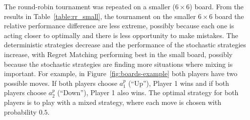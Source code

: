 \documentclass{article}
\begin{document}
%
The round-robin tournament was repeated on a smaller ($6 \times 6$) board. 
From the results in Table~\ref{table:rr_small}, 
the tournament on the smaller $6 \times 6$ board the relative performance difference are less extreme, possibly
because each one is acting closer to optimally and there is less opportunity to make mistakes.
The deterministic strategies decrease and the performance of the stochastic strategies increase, with Regret Matching 
performing best in the small board, possibly because the stochastic strategies are finding more situations where mixing 
is important. 
For example, in Figure~\ref{fig:boards-example} both players have two possible moves. If both players choose $a^{p}_{1}$ (``Up''), Player 1 wins and if both players choose $a^{p}_{2}$ (``Down''), Player 1 also wins. The optimal strategy for both players is to play with a mixed strategy, where each move is chosen with probability $0.5$. 


\end{document}
